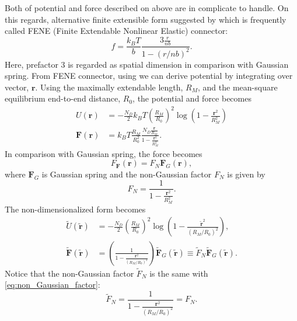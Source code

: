 \documentclass[10pt, a4paper]{report}
\begin{document}
Both of potential and force described on above are in complicate to handle. On this regards,  alternative finite extensible form suggested by \textcite{HaroldR.Warner1972} which is frequently called FENE (Finite Extendable Nonlinear Elastic) connector:
\begin{equation}
  f = \frac{k_BT}{b}\frac{3\frac{r}{nb}}{1-(r/nb)^2}.
\end{equation}
Here, prefactor $3$ is regarded as spatial dimension in comparison with Gaussian spring. 
From FENE connector, using we can derive potential by integrating over vector, $\mathbf{r}$.
Using the maximally extendable length, $R_M$, and the mean-square equilibrium end-to-end distance, $R_0$, the potential and force becomes
\begin{align}
U(\mathbf{r}) &= - \frac{N_D}{2}k_BT\left(\frac{R_M}{R_0}\right)^2\log\left(1 - \frac{\mathbf{r}^2}{R_M^2}\right) \\
\mathbf{F}(\mathbf{r}) &= k_BT\frac{R_M}{R_0^2}\frac{N_D\frac{\mathbf{r}}{R_M}}{1-\frac{\mathbf{r}^2}{R_M^2}}.
\end{align}
In comparison with Gaussian spring, the force becomes
\begin{equation}F_
\mathbf{F}(\mathbf{r}) = F_N\mathbf{F}_G(\mathbf{r}),
\end{equation}
where $\mathbf{F}_G$ is Gaussian spring and the non-Gaussian factor $F_N$ is given by
\begin{equation}
F_N = \frac{1}{1-\frac{\mathbf{r}^2}{R_M^2}}.\label{eq:non_Gaussian_factor}
\end{equation}
The non-dimensionalized form becomes
\begin{align}
\tilde{U}(\tilde{\mathbf{r}}) &= -\frac{N_D}{2}\left(\frac{R_M}{R_0}\right)^2\log\left(1-\frac{\tilde{\mathbf{r}}^2}{(R_M/R_0)^2}\right),\\
\tilde{\mathbf{F}}(\tilde{\mathbf{r}}) &= \left(\frac{1}{1 - \frac{\mathbf{r}^2}{(R_M/R_0)^2}}\right)\tilde{\mathbf{F}}_G(\tilde{\mathbf{r}}) \equiv \tilde{F}_N\tilde{\mathbf{F}}_G(\tilde{\mathbf{r}}).
\end{align}
Notice that the non-Gaussian factor $\tilde{F}_N$ is the same with \eqref{eq:non_Gaussian_factor}:
\begin{equation}
\tilde{F}_N = \frac{1}{1 - \frac{\mathbf{r}^2}{(R_M/R_0)^2}} = F_N.
\end{equation}
\end{document}
